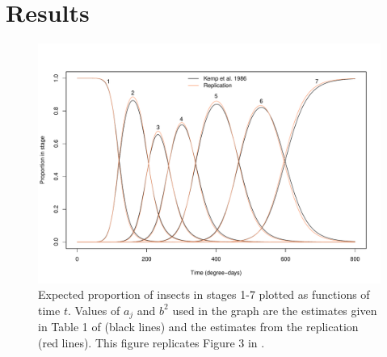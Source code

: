 \section{Results}
\begin{figure}[p]
  \centering
  \includegraphics[width=\textwidth]{../figures/dennis_fig3.pdf}
  \caption{Expected proportion of insects in stages 1-7 plotted as functions of time $t$. Values of $a_j$ and $b^2$ used in the graph are the estimates given in Table 1 of \citep{kemp1986stochastic} (black lines) and the estimates from the replication (red lines). This figure replicates Figure 3 in \citep{dennis1986stochastic}.}
  \label{fig:fig2}
\end{figure}